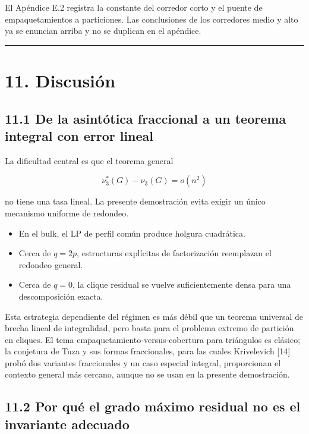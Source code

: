 \documentclass[spanish,11pt,a4paper]{article}
\providecommand{\tightlist}{\setlength{\itemsep}{0pt}\setlength{\parskip}{0pt}}
\begin{document}
El Apéndice E.2 registra la constante del corredor corto y el puente de
empaquetamientos a particiones. Las conclusiones de los corredores medio
y alto ya se enuncian arriba y no se duplican en el apéndice.

\begin{center}\rule{0.5\linewidth}{0.5pt}\end{center}

\section{11. Discusión}\label{discusiuxf3n}

\subsection{11.1 De la asintótica fraccional a un teorema integral con
error
lineal}\label{de-la-asintuxf3tica-fraccional-a-un-teorema-integral-con-error-lineal}

La dificultad central es que el teorema general

\[
\nu_3^*(G)-\nu_3(G)=o(n^2)
\]

no tiene una tasa lineal. La presente demostración evita exigir un único
mecanismo uniforme de redondeo.

\begin{itemize}
\tightlist
\item
  En el bulk, el LP de perfil común produce holgura cuadrática.
\item
  Cerca de \(q=2p\), estructuras explícitas de factorización reemplazan
  el redondeo general.
\item
  Cerca de \(q=0\), la clique residual se vuelve suficientemente densa
  para una descomposición exacta.
\end{itemize}

Esta estrategia dependiente del régimen es más débil que un teorema
universal de brecha lineal de integralidad, pero basta para el problema
extremo de partición en cliques. El tema
empaquetamiento-versus-cobertura para triángulos es clásico; la
conjetura de Tuza y sus formas fraccionales, para las cuales Krivelevich
{[}14{]} probó dos variantes fraccionales y un caso especial integral,
proporcionan el contexto general más cercano, aunque no se usan en la
presente demostración.

\subsection{11.2 Por qué el grado máximo residual no es el invariante
adecuado}\label{por-quuxe9-el-grado-muxe1ximo-residual-no-es-el-invariante-adecuado}
\end{document}
